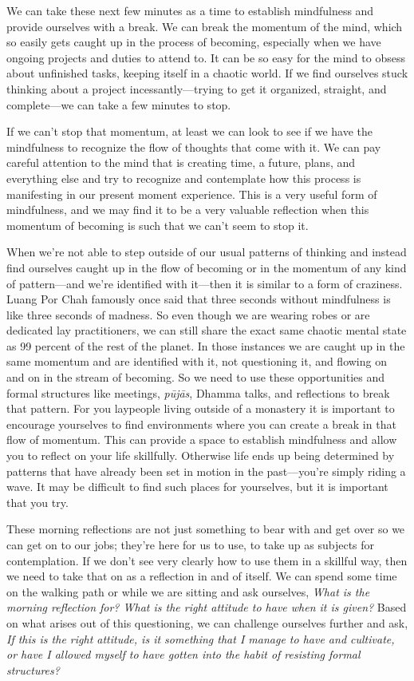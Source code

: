 
We can take these next few minutes as a time to establish mindfulness 
and provide ourselves with a break. We can break the momentum of the 
mind, which so easily gets caught up in the process of becoming, 
especially when we have ongoing projects and duties to attend to. It 
can be so easy for the mind to obsess about unfinished tasks, keeping 
itself in a chaotic world. If we find ourselves stuck thinking about a 
project incessantly---trying to get it organized, straight, and 
complete---we can take a few minutes to stop.

If we can't stop that momentum, at least we can look to see if we have 
the mindfulness to recognize the flow of thoughts that come with it. We 
can pay careful attention to the mind that is creating time, a future, 
plans, and everything else and try to recognize and contemplate how 
this process is manifesting in our present moment experience. This is a 
very useful form of mindfulness, and we may find it to be a very 
valuable reflection when this momentum of becoming is such that we 
can't seem to stop it.

When we're not able to step outside of our usual patterns of thinking 
and instead find ourselves caught up in the flow of becoming or in the 
momentum of any kind of pattern---and we're identified with it---then 
it is similar to a form of craziness. Luang Por Chah famously once said 
that three seconds without mindfulness is like three seconds of 
madness. So even though we are wearing robes or are dedicated lay 
practitioners, we can still share the exact same chaotic mental state 
as 99 percent of the rest of the planet. In those instances we are 
caught up in the same momentum and are identified with it, not 
questioning it, and flowing on and on in the stream of becoming. So we 
need to use these opportunities and formal structures like meetings, 
\emph{pūjās}, Dhamma talks, and reflections to break that pattern. 
For you laypeople living outside of a monastery it is important to 
encourage yourselves to find environments where you can create a break 
in that flow of momentum. This can provide a space to establish 
mindfulness and allow you to reflect on your life skillfully. Otherwise 
life ends up being determined by patterns that have already been set in 
motion in the past---you're simply riding a wave. It may be difficult 
to find such places for yourselves, but it is important that you try.

These morning reflections are not just something to bear with and get 
over so we can get on to our jobs; they're here for us to use, to take 
up as subjects for contemplation. If we don't see very clearly how to 
use them in a skillful way, then we need to take that on as a 
reflection in and of itself. We can spend some time on the walking path 
or while we are sitting and ask ourselves, \emph{What is the morning 
reflection for? What is the right attitude to have when it is given?} 
Based on what arises out of this questioning, we can challenge 
ourselves further and ask, \emph{If this is the right attitude, is it 
something that I manage to have and cultivate, or have I allowed myself 
to have gotten into the habit of resisting formal structures?}

